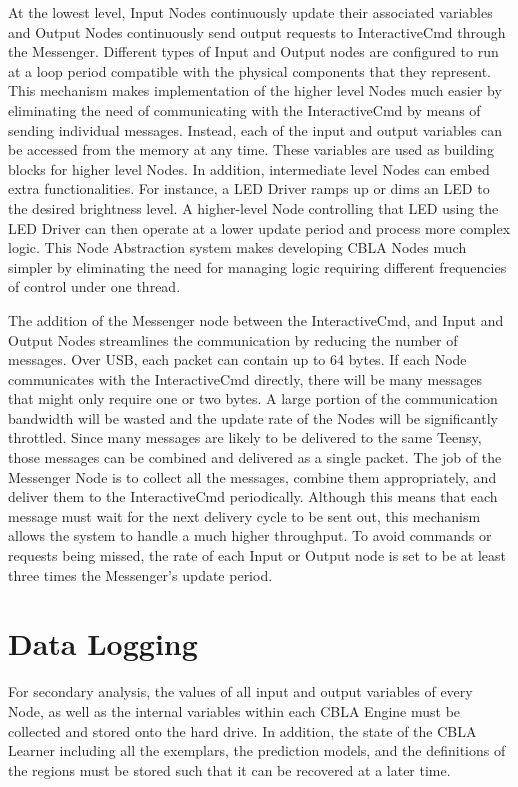 At the lowest level, Input Nodes continuously update their associated variables and Output Nodes continuously send output requests to InteractiveCmd through the Messenger. Different types of Input and Output nodes are configured to run at a loop period compatible with the physical components that they represent. This mechanism makes implementation of the higher level Nodes much easier by eliminating the need of communicating with the InteractiveCmd by means of sending individual messages. Instead, each of the input and output variables can be accessed from the memory at any time. These variables are used as building blocks for higher level Nodes. In addition, intermediate level Nodes can embed extra functionalities. For instance, a LED Driver ramps up or dims an LED to the desired brightness level. A higher-level Node controlling that LED using the LED Driver can then operate at a lower update period and process more complex logic. This Node Abstraction system makes developing CBLA Nodes much simpler by eliminating the need for managing logic requiring different frequencies of control under one thread. 

The addition of the Messenger node between the InteractiveCmd, and Input and Output Nodes streamlines the communication by reducing the number of messages. Over USB, each packet can contain up to 64 bytes. If each Node communicates with the InteractiveCmd directly, there will be many messages that might only require one or two bytes. A large portion of the communication bandwidth will be wasted and the update rate of the Nodes will be significantly throttled. Since many messages are likely to be delivered to the same Teensy, those messages can be combined and delivered as a single packet. The job of the Messenger Node is to collect all the messages, combine them appropriately, and deliver them to the InteractiveCmd periodically. Although this means that each message must wait for the next delivery cycle to be sent out, this mechanism allows the system to handle a much higher throughput. To avoid commands or requests being missed, the rate of each Input or Output node is set to be at least three times the Messenger's update period. 


\FloatBarrier
\section{Data Logging}

For secondary analysis, the values of all input and output variables of every Node, as well as the internal variables within each CBLA Engine must be collected and stored onto the hard drive. In addition, the state of the CBLA Learner including all the exemplars, the prediction models, and the definitions of the regions must be stored such that it can be recovered at a later time. 

